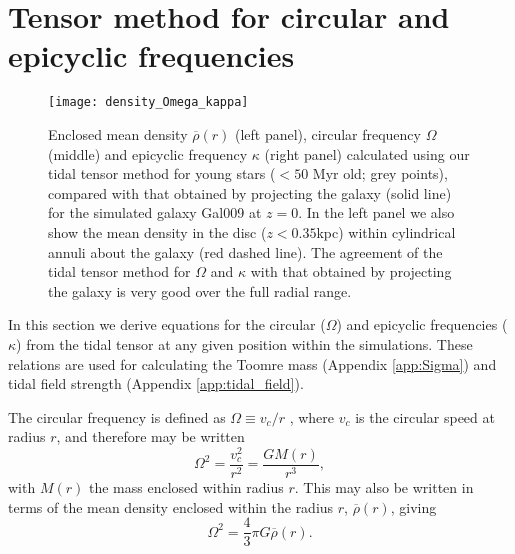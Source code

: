 \documentclass[fleqn,usenatbib]{mnras}
\newcommand{\mean}[1]{\overline{#1}}
\begin{document}





\appendix

\section{Tensor method for circular and epicyclic frequencies} \label{app:kappa}

\begin{figure*}
  \texttt{[image: density\_Omega\_kappa]}
  \caption{ 
Enclosed mean density $\mean{\rho}(r)$ (left panel), circular frequency $\Omega$ (middle) and epicyclic frequency $\kappa$ (right panel) calculated using our tidal tensor method for young stars ($<50$ Myr old; grey points), compared with that obtained by projecting the galaxy (solid line) for the simulated galaxy Gal009 at $z=0$. In the left panel we also show the mean density in the disc ($z<0.35$kpc) within cylindrical annuli about the galaxy (red dashed line). The agreement of the tidal tensor method for $\Omega$ and $\kappa$ with that obtained by projecting the galaxy is very good over the full radial range. }
  \label{fig:kappa}
\end{figure*}


In this section we derive equations for the circular ($\Omega$) and epicyclic frequencies ($\kappa$) from the tidal tensor at any given position within the simulations. These relations are used for calculating the Toomre mass (Appendix \ref{app:Sigma}) and tidal field strength (Appendix \ref{app:tidal_field}).

The circular frequency is defined as $\Omega \equiv v_c/r$ \citep{Binney_and_Tremaine_08}, where $v_c$ is the circular speed at radius $r$, and therefore may be written
\begin{equation}
\Omega^2 = \frac{v_c^2}{r^2} = \frac{G M(r)}{r^3} ,
\end{equation}
with $M(r)$ the mass enclosed within radius $r$.
This may also be written in terms of the mean density enclosed within the radius $r$, $\mean{\rho}(r)$, giving
\begin{equation} \label{eq:Omega_rho}
\Omega^2 = \frac{4}{3} \pi G \mean{\rho}(r).
\end{equation}
\end{document}
